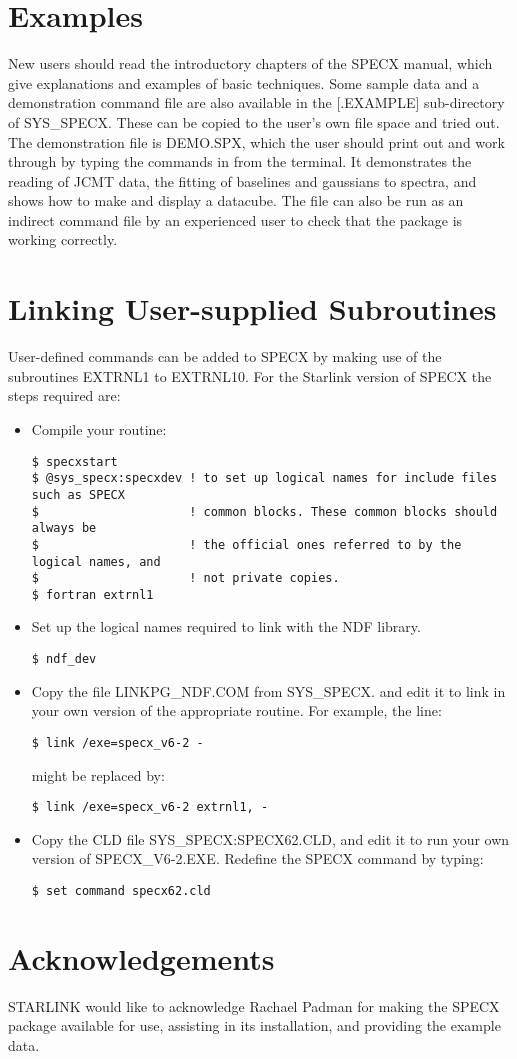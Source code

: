 \section {Examples}
New users should read the introductory chapters of the SPECX manual,
which give explanations and examples of basic techniques. Some sample
data and a demonstration command file are also available in the
[.EXAMPLE] sub-directory of SYS\_SPECX. These can be copied to the user's own
file space and tried out. The demonstration file is DEMO.SPX,
which the user should print out and work through by typing the commands
in from the terminal. It demonstrates the reading of JCMT data,
the fitting of baselines and gaussians to spectra, and shows how to make
and display a datacube. The file can also be run as an indirect command
file by an experienced user to check that the package is working correctly.

\section{Linking User-supplied Subroutines}
User-defined commands can be added to SPECX by making use of the
subroutines EXTRNL1 to EXTRNL10. For the Starlink version of SPECX 
the steps required are:

\begin{itemize}
\item
Compile your routine:
\begin{small}
\begin{verbatim}
$ specxstart
$ @sys_specx:specxdev ! to set up logical names for include files such as SPECX
$                     ! common blocks. These common blocks should always be
$                     ! the official ones referred to by the logical names, and
$                     ! not private copies.
$ fortran extrnl1

\end{verbatim}
\end{small}
\item
Set up the logical names required to link with the NDF library.
\begin{verbatim}
$ ndf_dev
\end{verbatim}

\item
Copy the file LINKPG\_NDF.COM from SYS\_SPECX. 
and edit it to link
in your own version of the appropriate routine. For example, the
line:
\begin{verbatim}
$ link /exe=specx_v6-2 -
\end{verbatim}
might be replaced by:
\begin{verbatim}
$ link /exe=specx_v6-2 extrnl1, -
\end{verbatim}
\item
Copy the CLD file SYS\_SPECX:SPECX62.CLD, and 
edit it to run your own version of SPECX\_V6-2.EXE. 
Redefine the SPECX command by typing:
\begin{verbatim}
$ set command specx62.cld
\end{verbatim}
\end{itemize}

\section{Acknowledgements}
STARLINK would like to acknowledge Rachael Padman for making
the SPECX package available for use, assisting in its installation,
and providing the example data.


